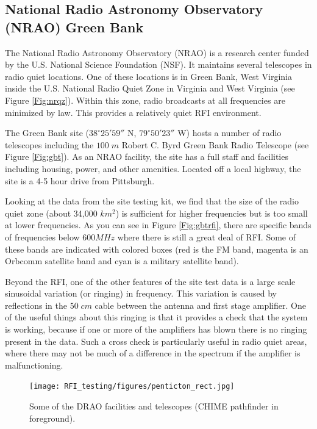 \subsection{National Radio Astronomy Observatory (NRAO) Green Bank}

The National Radio Astronomy Observatory (NRAO) is a research center funded by the U.S. National Science Foundation (NSF). It maintains several telescopes in radio quiet locations. One of these locations is in Green Bank, West Virginia inside the U.S. National Radio Quiet Zone in Virginia and West Virginia (see Figure \ref{Fig:nrqz}). Within this zone, radio broadcasts at all frequencies are minimized by law. This provides a relatively quiet RFI environment. 

The Green Bank site ($38^\circ 25' 59''$ N, $79^\circ 50' 23''$ W) hosts a number of radio telescopes including the $100 \; m$ Robert C. Byrd Green Bank Radio Telescope (see Figure \ref{Fig:gbt}). As an NRAO facility, the site has a full staff and facilities including housing, power, and other amenities. Located off a local highway, the site is a 4-5 hour drive from Pittsburgh. 

Looking at the data from the site testing kit, we find that the size of the radio quiet zone (about 34,000 $km^2$) is sufficient for higher frequencies but is too small at lower frequencies. As you can see in Figure \ref{Fig:gbtrfi}, there are specific bands of frequencies below $600 MHz$ where there is still a great deal of RFI. Some of these bands are indicated with colored boxes (red is the FM band, magenta is an Orbcomm satellite band and cyan is a military satellite band). 

Beyond the RFI, one of the other features of the site test data is a large scale sinusoidal variation (or ringing) in frequency. This variation is caused by reflections in the $50 \; cm$ cable between the antenna and first stage amplifier. One of the useful things about this ringing is that it provides a check that the system is working, because if one or more of the amplifiers has blown there is no ringing present in the data. Such a cross check is particularly useful in radio quiet areas, where there may not be much of a difference in the spectrum if the amplifier is malfunctioning. 

\begin{figure}[htb]
\begin{center}
\texttt{[image: RFI\_testing/figures/penticton\_rect.jpg]}
\caption{Some of the DRAO facilities and telescopes (CHIME pathfinder in foreground). }
\label{Fig:penticton}
\end{center}
\end{figure}

